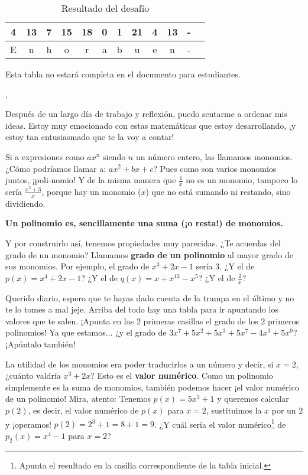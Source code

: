 \documentclass{article}
\DeclareRobustCommand{\augiefamily}{%
  \fontfamily{augie}\fontseries{m}\fontshape{n}\selectfont}
\begin{document}
\begin{table}
\centering
\caption{Resultado del desafío}
\begin{tabular}{|c|c|c|c|c|c|c|c|c|c|c|c|}
\hline
4 & 13 & 7 & 15 & 18 & 0 & 1 & 21 & 4 & 13 & -\\\hline
E & n  & h & o & r & a & b & u & e & n & -\\\hline
\end{tabular}

\small{Esta tabla no estará completa en el documento para estudiantes.}
\end{table}

\augiefamily{Querido diario},
\Fontauri

Después de un largo día de trabajo y reflexión, puedo sentarme a ordenar mis ideas.
%
Estoy muy emocionado con estas matemáticas que estoy desarrollando, ¡y estoy tan entusiasmado que te la voy a contar!


Si a expresiones como $ax^n$ siendo $n$ un número entero, las llamamos monomios. ¿Cómo podríamos llamar a: $ax^2+bx+c$? 
%
Pues como son varios monomios juntos, ¡poli-nomio!
%
Y de la misma manera que $\frac{1}{x}$ no es un monomio, tampoco lo sería $\frac{x^2+3}{x}$, porque hay un monomio ($x$) que no está sumando ni restando, sino dividiendo.

\textbf{Un polinomio es, sencillamente una suma (¡o resta!) de monomios.}

Y por construirlo así, tenemos propiedades muy parecidas. ¿Te acuerdas del grado de un monomio?
%
Llamamos \textbf{grado de un polinomio} al mayor grado de sus monomios. Por ejemplo, el grado de $x^3+2x-1$ sería $3$.
%
¿Y el de $p(x) = x^4+2x-1$? ¿Y el de $q(x) = x+x^{13}-x^5$? ¿Y el de $\frac{2}{x}$?

Querido diario, espero que te hayas dado cuenta de la trampa en el último y no te lo tomes a mal jeje.
%
Arriba del todo hay una tabla para ir apuntando los valores que te salen. ¡Apunta en las 2 primeras casillas el grado de los 2 primeros polinomios!
%
Ya que estamos... ¿y el grado de $3x^7+5x^2+5x^3+5x^7-4x^3+5x^0$? ¡Apúntalo también!

La utilidad de los monomios era poder traducirlos a un número y decir, si $x=2$, ¿cuánto valdría $x^3+2x$? 
%
Esto es el \textbf{valor numérico}.
%
Como un polinomio simplemente es la suma de monomios, también podemos hacer ¡el valor numérico de un polinomio! 
%
Mira, atento:
%
Tenemos $p(x) = 5x^3+1$ y queremos calcular $p(2)$, es decir, el valor numérico de $p(x)$ para $x=2$, sustituimos la $x$ por un $2$ y ¡operamos! $p(2) = 2^3+1=8+1=9$.
%
¿Y cuál sería el valor numérico\footnote{Apunta el resultado en la casilla correspondiente de la tabla inicial.} de $p_2(x) = x^4-1$ para $x=2$? 
\end{document}

